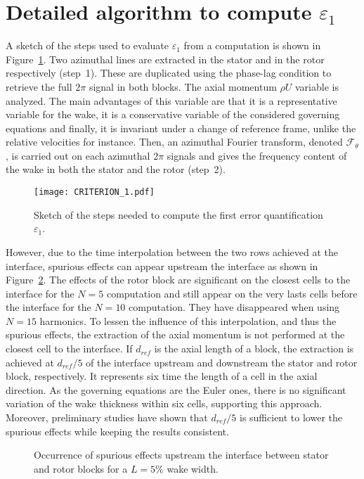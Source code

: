 
\section{Detailed algorithm to compute \texorpdfstring{$\varepsilon_1$}{e1}}
\label{app:epsilon_1_steps}

A sketch of the steps used to 
evaluate $\varepsilon_1$ from a computation is 
shown in Figure~\ref{fig:CRITERION_1}.
Two azimuthal lines are extracted in the
stator and in the rotor respectively (step~\textcircled{\small{1}}). 
These are duplicated using the phase-lag
condition to retrieve the full $2 \pi$ signal in both 
blocks. The
axial momentum $\rho U$ variable is analyzed. The main advantages of
this variable are that it is a representative variable
for the wake, it is a conservative variable of the considered governing 
equations and finally, it is invariant under a change of reference frame, 
unlike the relative velocities for instance.
Then, an azimuthal Fourier transform,
denoted $\mathcal{F}_\theta$, is carried out on each azimuthal $2 \pi$ signals 
and gives the frequency content
of the wake in both the stator and the rotor (step~\textcircled{\small{2}}).
\begin{figure}[htp]
  \centering
  \texttt{[image: CRITERION\_1.pdf]}
  \caption{Sketch of the steps needed to 
  compute the first error quantification $\varepsilon_1$.}
  \label{fig:CRITERION_1}
\end{figure}
However, due to the time interpolation 
between the two rows achieved 
at the interface, spurious effects can 
appear upstream the interface as shown in Figure~\ref{fig:rb_spurious_interf}. 
The effects of the rotor block are significant on the 
closest cells to the interface for the $N=5$ computation 
and still appear on the very lasts cells before the 
interface for the $N=10$ computation. 
They have disappeared when using $N=15$ harmonics.
To lessen the influence of this interpolation, and thus
the spurious effects,
the extraction of the axial momentum 
is not performed at the closest 
cell to the interface. If $d_{ref}$ is 
the axial length of a block, the extraction is achieved 
at $d_{ref} / 5$ of the interface upstream and downstream
the stator and rotor block, respectively. 
It represents six time the length of a cell 
in the axial direction.
As the governing equations are the Euler ones, 
there is no significant variation of the wake thickness 
within six cells, supporting this approach.
Moreover, preliminary studies have shown that $d_{ref} / 5$ is 
sufficient
to lower the spurious effects while keeping the
results consistent.
\begin{figure}[htp]
\centering
  \quad
  \quad
  \caption{Occurrence of spurious effects upstream 
  the interface between stator and rotor blocks for a $L=5\%$ wake width.}
  \label{fig:rb_spurious_interf}
\end{figure}

